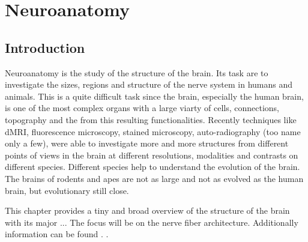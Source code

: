 \setcounter{chapter}{1}
\chapter{Neuroanatomy}
\label{sec:neuro}
% 

%
\section{Introduction}
% 
Neuroanatomy is the study of the structure of the brain.
Its task are to investigate the sizes, regions and structure of the nerve system in humans and animals.
This is a quite difficult task since the brain, especially the human brain, is one of the most complex organs with a large viarty of cells, connections, topography and the from this resulting functionalities.
Recently techniques like \ac{dMRI}, fluorescence microscopy, stained microscopy, auto-radiography (too name only a few), were able to investigate more and more structures from different points of views in the brain at different resolutions, modalities and contrasts on different species.
Different species help to understand the evolution of the brain. The brains of rodents and apes are not as large and not as evolved as the human brain, but evolutionary still close.
\par
This chapter provides a tiny and broad overview of the structure of the brain with its major ...
The focus will be on the nerve fiber architecture.
Additionally information can be found \eg{} \dummy{}.
.
%
% 
% 
